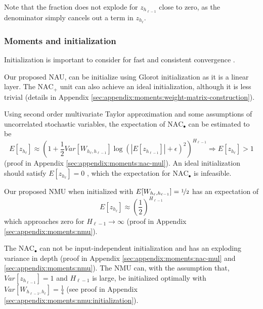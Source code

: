 Note that the fraction does not explode for $z_{h_{\ell-1}}$ close to zero, as the denominator simply cancels out a term in $z_{h_\ell}$.

\subsubsection{Moments and initialization}

Initialization is important to consider for fast and consistent convergence \cite{glorot-initialization}.

Our proposed NAU, can be initialize using Glorot initialization as it is a linear layer. The $\mathrm{NAC}_{+}$ unit can also achieve an ideal initialization, although it is less trivial (details in Appendix \ref{sec:appendix:moments:weight-matrix-construction}).

Using second order multivariate Taylor approximation and some assumptions of uncorrelated stochastic variables, the expectation of $\mathrm{NAC}_{\bullet}$ can be estimated to be
\begin{equation}
E[z_{h_\ell}] \approx \left(1 + \frac{1}{2} Var[W_{h_\ell, h_{\ell-1}}] \log(|E[z_{h_{\ell-1}}]| + \epsilon)^2\right)^{H_{\ell-1}} \Rightarrow E[z_{h_\ell}] > 1 \label{eq:nac-mul:expectation}
\end{equation}
(proof in Appendix \ref{sec:appendix:moments:nac-mul}). An ideal initialization should satisfy $E[z_{h_\ell}] = 0$ \cite{glorot-initialization}, which the expectation for $\mathrm{NAC}_{\bullet}$ is infeasible.

Our proposed NMU when initialized with $E[W_{h_{\ell}, h_{\ell - 1}}] = \nicefrac{1}{2}$ has an expectation of
\begin{equation}
E[z_{h_\ell}] \approx \left(\frac{1}{2}\right)^{H_{\ell-1}}
\end{equation}
which approaches zero for $H_{\ell-1} \rightarrow \infty$ (proof in Appendix \ref{sec:appendix:moments:nmu}).

The $\mathrm{NAC}_{\bullet}$ can not be input-independent initialization and has an exploding variance in depth (proof in Appendix \ref{sec:appendix:moments:nac-mul} and \ref{sec:appendix:moments:nmu}).
The NMU can, with the assumption that, $Var[z_{h_{\ell-1}}] = 1$ and $H_{\ell-1}$ is large, be initialized optimally with $Var[W_{h_{\ell-1},h_\ell}] = \frac{1}{4}$ (see proof in Appendix \ref{sec:appendix:moments:nmu:initialization}).

